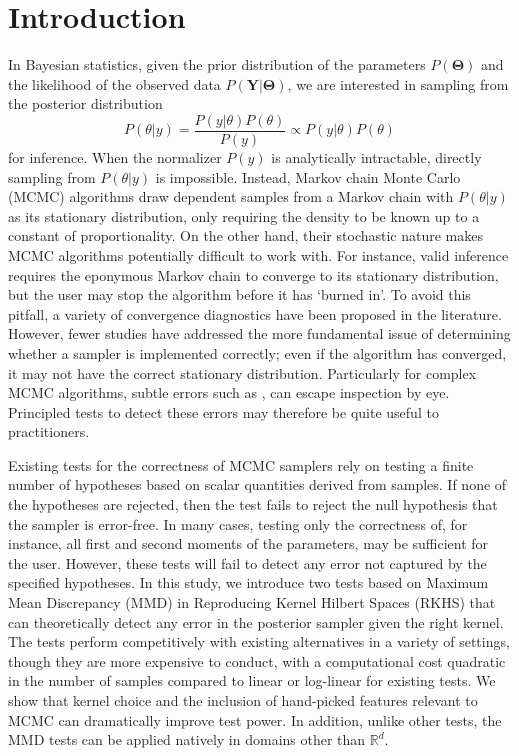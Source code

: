 \documentclass[a4paper,11pt]{article}
\begin{document}
\section{Introduction}
In Bayesian statistics, given the prior distribution of the parameters $P(\mathbf{\Theta})$ and the likelihood of the observed data $P(\mathbf{Y} | \mathbf{\Theta})$, we are interested in sampling from the posterior distribution
\begin{equation}
    P(\theta | y) = \frac{P(y | \theta)P(\theta)}{P(y)} \propto P(y | \theta)P(\theta)
    \label{eq:posterior}
\end{equation}
for inference. When the normalizer $P(y)$ is analytically intractable, directly sampling from $P(\theta | y)$ is impossible. Instead, Markov chain Monte Carlo (MCMC) algorithms draw dependent samples from a Markov chain with $P(\theta | y)$ as its stationary distribution, only requiring the density to be known up to a constant of proportionality. On the other hand, their stochastic nature makes MCMC algorithms potentially difficult to work with. For instance, valid inference requires the eponymous Markov chain to converge to its stationary distribution, but the user may stop the algorithm before it has `burned in'. To avoid this pitfall, a variety of convergence diagnostics have been proposed in the literature. However, fewer studies have addressed the more fundamental issue of determining whether a sampler is implemented correctly; even if the algorithm has converged, it may not have the correct stationary distribution. Particularly for complex MCMC algorithms, subtle errors such as \cite{del_negro_time_2015,karlsson_corrigendum_2017}, can escape inspection by eye. Principled tests to detect these errors may therefore be quite useful to practitioners.

Existing tests for the correctness of MCMC samplers rely on testing a finite number of hypotheses based on scalar quantities derived from samples. If none of the hypotheses are rejected, then the test fails to reject the null hypothesis that the sampler is error-free. In many cases, testing only the correctness of, for instance, all first and second moments of the parameters, may be sufficient for the user. However, these tests will fail to detect any error not captured by the specified hypotheses. In this study, we introduce two tests based on Maximum Mean Discrepancy (MMD) in Reproducing Kernel Hilbert Spaces (RKHS) that can theoretically detect any error in the posterior sampler given the right kernel. The tests perform competitively with existing alternatives in a variety of settings, though they are more expensive to conduct, with a computational cost quadratic in the number of samples compared to linear or log-linear for existing tests. We show that kernel choice and the inclusion of hand-picked features relevant to MCMC can dramatically improve test power. In addition, unlike other tests, the MMD tests can be applied natively in domains other than $\mathbb{R}^{d}$.
\end{document}
